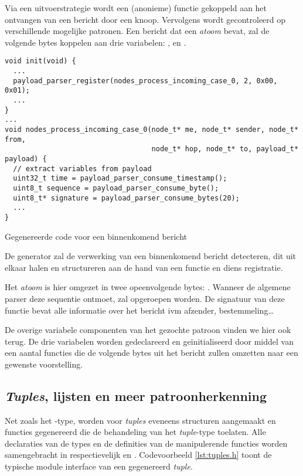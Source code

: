 Via een uitvoerstrategie wordt een (anonieme) functie gekoppeld aan het
ontvangen van een bericht door een knoop. Vervolgens wordt gecontroleerd op
verschillende mogelijke patronen. Een bericht dat een 
\emph{atoom} bevat, zal de volgende bytes koppelen aan drie variabelen:
,  en .

\begin{listing}[ht]
  \begin{verbatim}
void init(void) {
  ...
  payload_parser_register(nodes_process_incoming_case_0, 2, 0x00, 0x01);
  ...
}
...
void nodes_process_incoming_case_0(node_t* me, node_t* sender, node_t* from,
                                   node_t* hop, node_t* to, payload_t* payload) {
  // extract variables from payload
  uint32_t time = payload_parser_consume_timestamp();
  uint8_t sequence = payload_parser_consume_byte();
  uint8_t* signature = payload_parser_consume_bytes(20);
  ...
}
  \end{verbatim}
  \vspace{-5mm}
  \caption{Gegenereerde code voor een binnenkomend bericht}
  \label{lst:comm.c}
\end{listing}

De generator zal de verwerking van een binnenkomend bericht detecteren, dit uit
elkaar halen en structureren aan de hand van een functie en diens registratie.

Het \emph{atoom} is hier omgezet in twee opeenvolgende bytes: .
Wanneer de algemene parser deze sequentie ontmoet, zal
 opgeroepen worden. De signatuur van
deze functie bevat alle informatie over het bericht ivm afzender,
bestemmeling\dots

De overige variabele componenten van het gezochte patroon vinden we hier ook
terug. De drie variabelen worden gedeclareerd en ge\"initialiseerd door middel
van een aantal functies die de volgende bytes uit het bericht zullen omzetten
naar een gewenste voorstelling.

\subsection{\emph{Tuples}, lijsten en meer patroonherkenning}

Net zoals het -type, worden voor \emph{tuples} eveneens structuren
aangemaakt en functies gegenereerd die de behandeling van het \emph{tuple}-type
toelaten. Alle declaraties van de types en de definities van de manipulerende
functies worden samengebracht in respectievelijk  en
. Codevoorbeeld \ref{lst:tuples.h} toont de typische module
interface van een gegenereerd \emph{tuple}.

